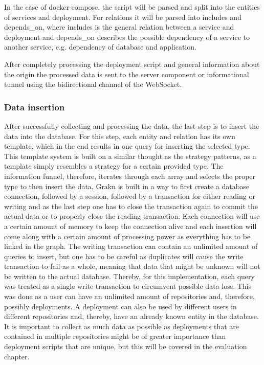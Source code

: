 In the case of docker-compose, the script will be parsed and split into the entities of services and deployment. For relations it will be parsed into includes and depends\_on, where includes is the general relation between a service and deployment and depends\_on describes the possible dependency of a service to another service, e.g. dependency of database and application.

After completely processing the deployment script and general information about the origin the processed data is sent to the server component or informational tunnel using the bidirectional channel of the WebSocket.

\subsubsection{Data insertion}
\label{sec:data_insertion}
After successfully collecting and processing the data, the last step is to insert the data into the database. For this step, each entity and relation has its own template, which in the end results in one query for inserting the selected type. This template system is built on a similar thought as the strategy patterns, as a template simply resembles a strategy for a certain provided type. The information funnel, therefore, iterates through each array and selects the proper type to then insert the data.
Grakn is built in a way to first create a database connection, followed by a session, followed by a transaction for either reading or writing and as the last step one has to close the transaction again to commit the actual data or to properly close the reading transaction.
Each connection will use a certain amount of memory to keep the connection alive and each insertion will come along with a certain amount of processing power as everything has to be linked in the graph.
The writing transaction can contain an unlimited amount of queries to insert, but one has to be careful as duplicates will cause the write transaction to fail as a whole, meaning that data that might be unknown will not be written to the actual database. Thereby, for this implementation, each query was treated as a single write transaction to circumvent possible data loss. This was done as a user can have an unlimited amount of repositories and, therefore, possibly deployments. A deployment can also be used by different users in different repositories and, thereby, have an already known entity in the database. It is important to collect as much data as possible as deployments that are contained in multiple repositories might be of greater importance than deployment scripts that are unique, but this will be covered in the evaluation chapter.

